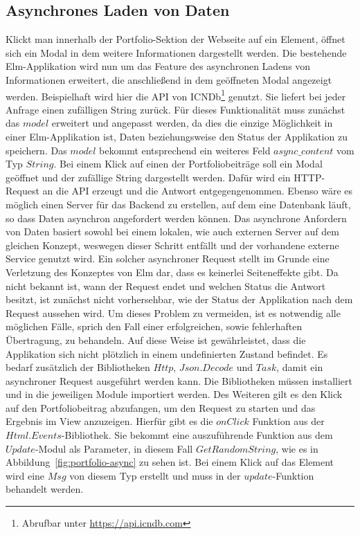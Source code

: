 \subsection{Asynchrones Laden von Daten}
\label{sec:async-laden}
Klickt man innerhalb der Portfolio-Sektion der Webseite auf ein Element, öffnet sich ein Modal in dem weitere Informationen dargestellt werden. Die bestehende Elm-Applikation wird nun um das Feature des asynchronen Ladens von Informationen erweitert, die anschließend in dem geöffneten Modal angezeigt werden. Beispielhaft wird hier die \ac{API} von \ac{ICNDb}\footnote{Abrufbar unter \url{https://api.icndb.com}} genutzt. Sie liefert bei jeder Anfrage einen zufälligen String zurück.
Für dieses Funktionalität muss zunächst das $model$ erweitert und angepasst werden, da dies die einzige Möglichkeit in einer Elm-Applikation ist, Daten beziehungsweise den Status der Applikation zu speichern. Das $model$ bekommt entsprechend ein weiteres Feld $async\_content$ vom Typ $String$.
Bei einem Klick auf einen der Portfoliobeiträge soll ein Modal geöffnet und der zufällige String dargestellt werden. Dafür wird ein \ac{HTTP}-Request an die \ac{API} erzeugt und die Antwort entgegengenommen. Ebenso wäre es möglich einen Server für das Backend zu erstellen, auf dem eine Datenbank läuft, so dass Daten asynchron angefordert werden können. Das asynchrone Anfordern von Daten basiert sowohl bei einem lokalen, wie auch externen Server auf dem gleichen Konzept, weswegen dieser Schritt entfällt und der vorhandene externe Service genutzt wird.
Ein solcher asynchroner Request stellt im Grunde eine Verletzung des Konzeptes von Elm dar, dass es keinerlei Seiteneffekte gibt. Da nicht bekannt ist, wann der Request endet und welchen Status die Antwort besitzt, ist zunächst nicht vorhersehbar, wie der Status der Applikation nach dem Request aussehen wird. Um dieses Problem zu vermeiden, ist es notwendig alle möglichen Fälle, sprich den Fall einer erfolgreichen, sowie fehlerhaften Übertragung, zu behandeln. Auf diese Weise ist gewährleistet, dass die Applikation sich nicht plötzlich in einem undefinierten Zustand befindet. Es bedarf zusätzlich der Bibliotheken $Http$, $Json.Decode$ und $Task$, damit ein asynchroner Request ausgeführt werden kann. Die Bibliotheken müssen installiert und in die jeweiligen Module importiert werden. Des Weiteren gilt es den Klick auf den Portfoliobeitrag abzufangen, um den Request zu starten und das Ergebnis im View anzuzeigen. Hierfür gibt es die $onClick$ Funktion aus der $Html.Events$-Bibliothek. Sie bekommt eine auszuführende Funktion aus dem $Update$-Modul als Parameter, in diesem Fall $GetRandomString$, wie es in Abbildung~\ref{fig:portfolio-async} zu sehen ist. Bei einem Klick auf das Element wird eine $Msg$ von diesem Typ erstellt und muss in der $update$-Funktion behandelt werden.
